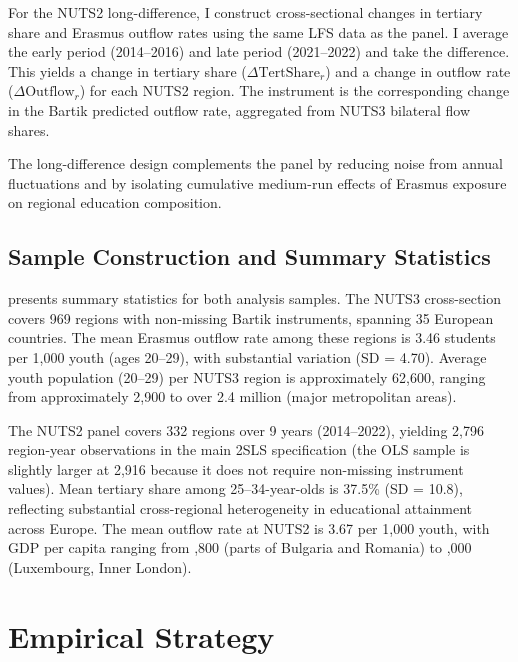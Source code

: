 \documentclass[12pt]{article}
\begin{document}
For the NUTS2 long-difference, I construct cross-sectional changes in tertiary share and Erasmus outflow rates using the same LFS data as the panel. I average the early period (2014--2016) and late period (2021--2022) and take the difference. This yields a change in tertiary share ($\Delta \text{TertShare}_{r}$) and a change in outflow rate ($\Delta \text{Outflow}_{r}$) for each NUTS2 region. The instrument is the corresponding change in the Bartik predicted outflow rate, aggregated from NUTS3 bilateral flow shares.

The long-difference design complements the panel by reducing noise from annual fluctuations and by isolating cumulative medium-run effects of Erasmus exposure on regional education composition.

\subsection{Sample Construction and Summary Statistics}

 presents summary statistics for both analysis samples. The NUTS3 cross-section covers 969 regions with non-missing Bartik instruments, spanning 35 European countries. The mean Erasmus outflow rate among these regions is 3.46 students per 1,000 youth (ages 20--29), with substantial variation (SD = 4.70). Average youth population (20--29) per NUTS3 region is approximately 62,600, ranging from approximately 2,900 to over 2.4 million (major metropolitan areas).



The NUTS2 panel covers 332 regions over 9 years (2014--2022), yielding 2,796 region-year observations in the main 2SLS specification (the OLS sample is slightly larger at 2,916 because it does not require non-missing instrument values). Mean tertiary share among 25--34-year-olds is 37.5\% (SD = 10.8), reflecting substantial cross-regional heterogeneity in educational attainment across Europe. The mean outflow rate at NUTS2 is 3.67 per 1,000 youth, with GDP per capita ranging from ,800 (parts of Bulgaria and Romania) to ,000 (Luxembourg, Inner London).


\section{Empirical Strategy}
\label{sec:strategy}
\end{document}
